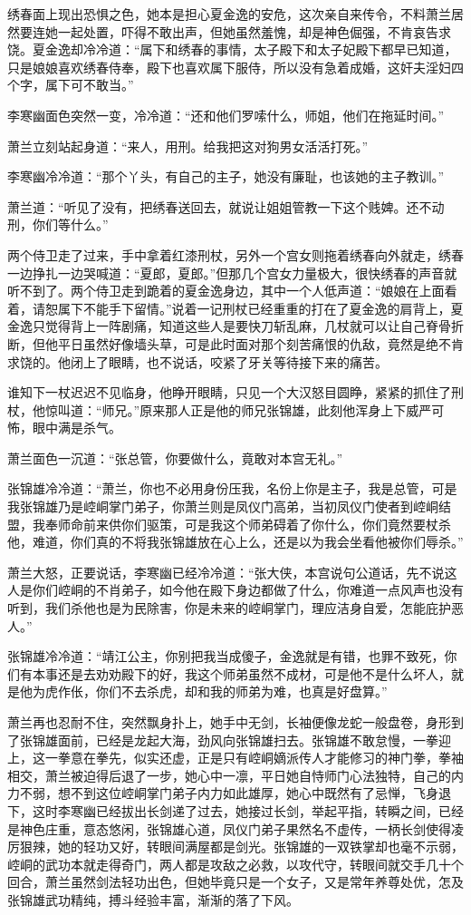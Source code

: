 绣春面上现出恐惧之色，她本是担心夏金逸的安危，这次亲自来传令，不料萧兰居然要连她一起处置，吓得不敢出声，但她虽然羞愧，却是神色倔强，不肯哀告求饶。夏金逸却冷冷道：“属下和绣春的事情，太子殿下和太子妃殿下都早已知道，只是娘娘喜欢绣春侍奉，殿下也喜欢属下服侍，所以没有急着成婚，这奸夫淫妇四个字，属下可不敢当。”

李寒幽面色突然一变，冷冷道：“还和他们罗嗦什么，师姐，他们在拖延时间。”

萧兰立刻站起身道：“来人，用刑。给我把这对狗男女活活打死。”

李寒幽冷冷道：“那个丫头，有自己的主子，她没有廉耻，也该她的主子教训。”

萧兰道：“听见了没有，把绣春送回去，就说让姐姐管教一下这个贱婢。还不动刑，你们等什么。”

两个侍卫走了过来，手中拿着红漆刑杖，另外一个宫女则拖着绣春向外就走，绣春一边挣扎一边哭喊道：“夏郎，夏郎。”但那几个宫女力量极大，很快绣春的声音就听不到了。两个侍卫走到跪着的夏金逸身边，其中一个人低声道：“娘娘在上面看着，请恕属下不能手下留情。”说着一记刑杖已经重重的打在了夏金逸的肩背上，夏金逸只觉得背上一阵剧痛，知道这些人是要快刀斩乱麻，几杖就可以让自己脊骨折断，但他平日虽然好像墙头草，可是此时面对那个刻苦痛恨的仇敌，竟然是绝不肯求饶的。他闭上了眼睛，也不说话，咬紧了牙关等待接下来的痛苦。

谁知下一杖迟迟不见临身，他睁开眼睛，只见一个大汉怒目圆睁，紧紧的抓住了刑杖，他惊叫道：“师兄。”原来那人正是他的师兄张锦雄，此刻他浑身上下威严可怖，眼中满是杀气。

萧兰面色一沉道：“张总管，你要做什么，竟敢对本宫无礼。”

张锦雄冷冷道：“萧兰，你也不必用身份压我，名份上你是主子，我是总管，可是我张锦雄乃是崆峒掌门弟子，你萧兰则是凤仪门高弟，当初凤仪门使者到崆峒结盟，我奉师命前来供你们驱策，可是我这个师弟碍着了你什么，你们竟然要杖杀他，难道，你们真的不将我张锦雄放在心上么，还是以为我会坐看他被你们辱杀。”

萧兰大怒，正要说话，李寒幽已经冷冷道：“张大侠，本宫说句公道话，先不说这人是你们崆峒的不肖弟子，如今他在殿下身边都做了什么，你难道一点风声也没有听到，我们杀他也是为民除害，你是未来的崆峒掌门，理应洁身自爱，怎能庇护恶人。”

张锦雄冷冷道：“靖江公主，你别把我当成傻子，金逸就是有错，也罪不致死，你们有本事还是去劝劝殿下的好，我这个师弟虽然不成材，可是他不是什么坏人，就是他为虎作伥，你们不去杀虎，却和我的师弟为难，也真是好盘算。”

萧兰再也忍耐不住，突然飘身扑上，她手中无剑，长袖便像龙蛇一般盘卷，身形到了张锦雄面前，已经是龙起大海，劲风向张锦雄扫去。张锦雄不敢怠慢，一拳迎上，这一拳意在拳先，似实还虚，正是只有崆峒嫡派传人才能修习的神门拳，拳袖相交，萧兰被迫得后退了一步，她心中一凛，平日她自恃师门心法独特，自己的内力不弱，想不到这位崆峒掌门弟子内力如此雄厚，她心中既然有了忌惮，飞身退下，这时李寒幽已经拔出长剑递了过去，她接过长剑，举起平指，转瞬之间，已经是神色庄重，意态悠闲，张锦雄心道，凤仪门弟子果然名不虚传，一柄长剑使得凌厉狠辣，她的轻功又好，转眼间满屋都是剑光。张锦雄的一双铁掌却也毫不示弱，崆峒的武功本就走得奇门，两人都是攻敌之必救，以攻代守，转眼间就交手几十个回合，萧兰虽然剑法轻功出色，但她毕竟只是一个女子，又是常年养尊处优，怎及张锦雄武功精纯，搏斗经验丰富，渐渐的落了下风。

